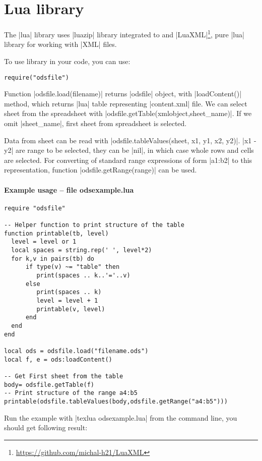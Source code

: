 \documentclass{ltxdoc}
\begin{document}
\section{Lua library}


The |lua| library uses |luazip| library integrated to \LuaTeX{} and |LuaXML|\footnote{\url{https://github.com/michal-h21/LuaXML}}, pure |lua| library for working with |XML| files.

To use library in your code, you can use:

\begin{verbatim}
require("odsfile")
\end{verbatim} 

Function |odsfile.load(filename)| returns |odsfile| object, with |loadContent()| method, which returns |lua| table representing |content.xml| file. We can select sheet from the spreadsheet with |odsfile.getTable(xmlobject,sheet_name)|. If we omit |sheet_name|, first sheet from spreadsheet is selected.

Data from sheet can be read with |odsfile.tableValues(sheet, x1, y1, x2, y2)|. |x1 - y2| are range to be selected, they can be |nil|, in which case whole rows and cells are selected. For converting of standard range expressions of form |a1:b2| to this representation, function |odsfile.getRange(range)| can be used.

\paragraph{Example usage -- file \textsf{odsexample.lua}}

\begin{verbatim}
require "odsfile"

-- Helper function to print structure of the table
function printable(tb, level)
  level = level or 1
  local spaces = string.rep(' ', level*2)
  for k,v in pairs(tb) do
      if type(v) ~= "table" then
         print(spaces .. k..'='..v)
      else
         print(spaces .. k)
         level = level + 1
         printable(v, level)
      end
  end
end

local ods = odsfile.load("filename.ods")
local f, e = ods:loadContent()

-- Get First sheet from the table
body= odsfile.getTable(f)
-- Print structure of the range a4:b5  
printable(odsfile.tableValues(body,odsfile.getRange("a4:b5")))
\end{verbatim}

Run the example with |texlua odsexample.lua| from the command line, you should get following result:
\end{document}
